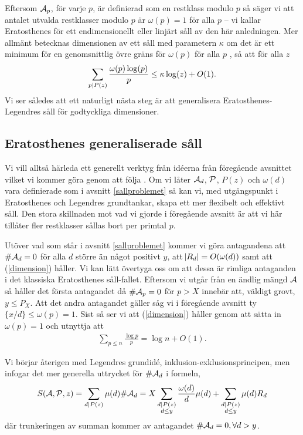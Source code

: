 Eftersom \(\A_p\), för varje $p$, är definierad som en restklass modulo $p$ så säger vi att antalet utvalda restklasser modulo $p$ är $\omega(p) = 1$ för alla $p$ -- vi kallar Eratosthenes för ett endimensionellt eller linjärt såll av den här anledningen. Mer allmänt betecknas dimensionen av ett såll med parametern \(\kappa\) om det är ett minimum för en genomsnittlig övre gräns för \(\omega(p)\) för alla $p$ \cite{tenenbaum}, så att för alla \(z\)
\begin{align} \label{dimension}
    \sum_{p \divides P(z)} \frac{\omega(p) \log(p)}{p} \leq \kappa \log(z) + O(1).
\end{align}
Vi ser således att ett naturligt nästa steg är att generalisera Eratosthenes-Legendres såll för godtyckliga dimensioner. 

\subsection{Eratosthenes generaliserade såll} \label{eratosthenes.gen.såll}
Vi vill alltså härleda ett generellt verktyg från idéerna från föregående avsnittet vilket vi kommer göra genom att följa \cite[Kapitel 5.4]{cojocarumurty}. Om vi låter $\A_d$, $\P$, $P(z)$ och $\omega(d)$ vara definierade som i avsnitt \ref{sallproblemet} så kan vi, med utgångspunkt i Eratosthenes och Legendres grundtankar, skapa ett mer flexibelt och effektivt såll. Den stora skillnaden mot vad vi gjorde i föregående avsnitt är att vi här tillåter fler restklasser sållas bort per primtal $p$. 

Utöver vad som står i avsnitt \ref{sallproblemet} kommer vi göra antagandena att \(\card{\A_d} = 0\) för alla \(d\) större än något positivt $y$, att \(\abs{R_d} = O(\omega(d))\) samt att (\ref{dimension}) håller. Vi kan lätt övertyga oss om att dessa är rimliga antaganden i det klassiska Eratosthenes såll-fallet. Eftersom vi utgår från en ändlig mängd $\A$ så håller det första antagandet då \(\card{\A_p} = 0\) för \(p > X\) innebär att, väldigt grovt, \(y \leq P_{X}\). Att det andra antagandet gäller såg vi i föregående avsnitt ty \(\{x/d\} \leq \omega(p) = 1\). Sist så ser vi att (\ref{dimension}) håller genom att sätta in \(\omega(p) = 1\) och utnyttja att \begin{align} \label{Thm.1.4.4}
    \sum_{p\leq n}\frac{\log p}{p} = \log n + O(1).
\end{align}

Vi börjar återigen med Legendres grundidé, inklusion-exklusionsprincipen, men infogar det mer generella uttrycket för $\card{\A_d}$ i formeln,
\begin{align*}
    \S{A}{P}{z} = \sum_{d \divides P(z)} \mu(d) \card{\A_d} = X \sum_{\substack{d \divides P(z) \\ d \leq y}} \frac{\omega(d)}{d} \mu(d) + \sum_{\substack{d \divides P(z)  \\ d \leq y}} \mu(d) R_d 
\end{align*}
där trunkeringen av summan kommer av antagandet \(\card{\A_d} = 0, \forall d > y\). 

